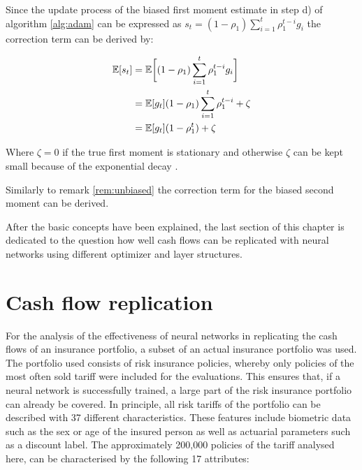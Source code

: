 \begin{remark}\label{rem:unbiased}
	Since the update process of the biased first moment estimate in step d) of algorithm \ref{alg:adam} can be expressed as $s_t = (1 - \rho_1) \sum_{i = 1}^t \rho_1^{t-i} g_i$ the correction term can be derived by:
	
	\begin{align*}
		\mathbb{E}[s_t] &= \mathbb{E} \bigg[ (1 - \rho_1) \sum_{i = 1}^t \rho_1^{t-i} g_i \bigg] \\
				&= \mathbb{E}[g_t] (1 - \rho_1)  \sum_{i = 1}^t \rho_1^{t-i} + \zeta \\
				&= \mathbb{E}[g_t] (1 - \rho_1^t) + \zeta
	\end{align*}
	
	Where $\zeta = 0 $ if the true first moment is stationary and otherwise $\zeta$ can be kept small because of the exponential decay \cite{kingma2014adam}.
\end{remark}

\begin{remark}
	Similarly to remark \ref{rem:unbiased} the correction term for the biased second moment can be derived.
\end{remark}

After the basic concepts have been explained, the last section of this chapter is dedicated to the question how well cash flows can be replicated with neural networks using different optimizer and layer structures. 


\section{Cash flow replication}

For the analysis of the effectiveness of neural networks in replicating the cash flows of an insurance portfolio, a subset of an actual insurance portfolio was used. The portfolio used consists of risk insurance policies, whereby only policies of the most often sold tariff were included for the evaluations. This ensures that, if a neural network is successfully trained, a large part of the risk insurance portfolio can already be covered. In principle, all risk tariffs of the portfolio can be described with 37 different characteristics. These features include biometric data such as the sex or age of the insured person as well as actuarial parameters such as a discount label. The approximately 200,000 policies of the tariff analysed here, can be characterised by the following 17 attributes:

